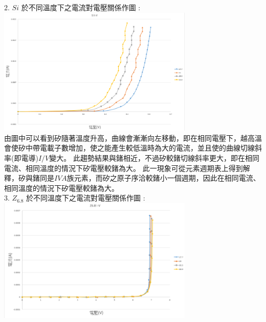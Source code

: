 \documentclass[UTF8]{ctexart}
\begin{document}
\begin{CJK*}{UTF8}{song}
2. $Si$ 於不同溫度下之電流對電壓關係作圖 : \\
\includegraphics[width = 0.7\textwidth]{siAll.png} \\
由圖中可以看到矽隨著溫度升高，曲線會漸漸向左移動，即在相同電壓下，越高溫會使矽中帶電載子數增加，使之能產生較低溫時為大的電流，並且使的曲線切線斜率(即電導)$I/V$變大。 此趨勢結果與鍺相近，不過矽較鍺切線斜率更大，即在相同電流、相同溫度的情況下矽電壓較鍺為大。 此一現象可從元素週期表上得到解釋，矽與鍺同是$IV A$族元素，而矽之原子序洽較鍺小一個週期，因此在相同電流、相同溫度的情況下矽電壓較鍺為大。\\

3. $Z_{6.8}$ 於不同溫度下之電流對電壓關係作圖 :  \\
\includegraphics[width = 0.7\textwidth]{z68All.png} \\
\newpage


\end{CJK*}
\end{document}
